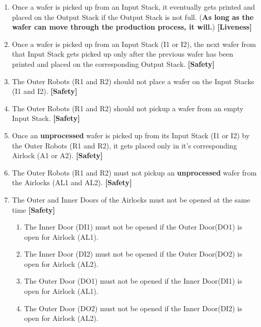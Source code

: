 \documentclass[a4paper,12pt]{article}
\begin{document}
	\begin{enumerate}
		\item Once a wafer is picked up from an Input Stack, it eventually gets printed and placed on the Output Stack if the Output Stack is not full. (\textbf{As long as the wafer can move through the production process, it will.}) \textbf{[Liveness]}
		\item Once a wafer is picked up from an Input Stack (I1 or I2), the next wafer from that Input Stack gets picked up only after the previous wafer has been printed and placed on the corresponding Output Stack. \textbf{[Safety]}
		\item The Outer Robots (R1 and R2) should not place a wafer on the Input Stacks (I1 and I2). \textbf{[Safety]}
		\item The Outer Robots (R1 and R2) should not pickup a wafer from an empty Input Stack. \textbf{[Safety]}
		\item Once an \textbf{unprocessed} wafer is picked up from its Input Stack (I1 or I2) by the Outer Robots (R1 and R2), it gets placed only in it's corresponding Airlock (A1 or A2). \textbf{[Safety]}
		\item The Outer Robots (R1 and R2) must not pickup an \textbf{unprocessed} wafer from the Airlocks (AL1 and AL2). \textbf{[Safety]}
		\item The Outer and Inner Doors of the Airlocks must not be opened at the same time \textbf{[Safety]}
		\begin{enumerate}
			\item The Inner Door (DI1) must not be opened if the Outer Door(DO1) is open for Airlock (AL1).
			
			\item The Inner Door (DI2) must not be opened if the Outer Door(DO2) is open for Airlock (AL2).
			
			\item The Outer Door (DO1) must not be opened if the Inner Door(DI1) is open for Airlock (AL1).
			
			\item The Outer Door (DO2) must not be opened if the Inner Door(DI2) is open for Airlock (AL2).
			

\end{enumerate}
\end{enumerate}
\end{document}

